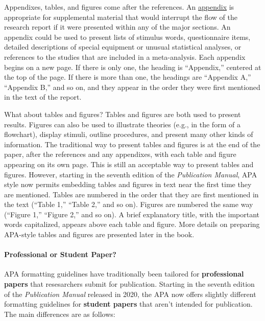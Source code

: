 \documentclass[
]{krantz}
\begin{document}
Appendixes, tables, and figures come after the references. An \protect\hyperlink{appendix}{appendix} is appropriate for supplemental material that would interrupt the flow of the research report if it were presented within any of the major sections. An appendix could be used to present lists of stimulus words, questionnaire items, detailed descriptions of special equipment or unusual statistical analyses, or references to the studies that are included in a meta-analysis. Each appendix begins on a new page. If there is only one, the heading is ``Appendix,'' centered at the top of the page. If there is more than one, the headings are ``Appendix A,'' ``Appendix B,'' and so on, and they appear in the order they were first mentioned in the text of the report.

What about tables and figures? Tables and figures are both used to present results. Figures can also be used to illustrate theories (e.g., in the form of a flowchart), display stimuli, outline procedures, and present many other kinds of information. The traditional way to present tables and figures is at the end of the paper, after the references and any appendixes, with each table and figure appearing on its own page. This is still an acceptable way to present tables and figures. However, starting in the seventh edition of the \emph{Publication Manual}, APA style now permits embedding tables and figures in text near the first time they are mentioned. Tables are numbered in the order that they are first mentioned in the text (``Table 1,'' ``Table 2,'' and so on). Figures are numbered the same way (``Figure 1,'' ``Figure 2,'' and so on). A brief explanatory title, with the important words capitalized, appears above each table and figure. More details on preparing APA-style tables and figures are presented later in the book.

\hypertarget{professional-or-student-paper}{%
\paragraph*{Professional or Student Paper?}\label{professional-or-student-paper}}

APA formatting guidelines have traditionally been tailored for \textbf{professional papers} that resesarchers submit for publication. Starting in the seventh edition of the \emph{Publication Manual} released in 2020, the APA now offers slightly different formatting guidelines for \textbf{student papers} that aren't intended for publication. The main differences are as follows:
\end{document}
